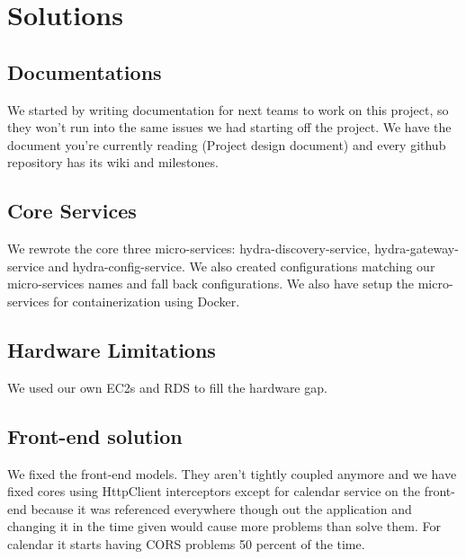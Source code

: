 \chapter{Solutions}
\section{Documentations}
We started by writing documentation for next teams to work on this project, so they won't run into the same issues we had starting off the project. We have the document you're currently reading (Project design document) and every github repository has its wiki and milestones.

\section{Core Services}
We rewrote the core three micro-services: hydra-discovery-service, hydra-gateway-service and hydra-config-service. We also created configurations matching our micro-services names and fall back configurations. We also have setup the micro-services for containerization using Docker.

\section{Hardware Limitations}
We used our own EC2s and RDS to fill the hardware gap.

\section{Front-end solution}
We fixed the front-end models. They aren't tightly coupled anymore and we have fixed cores using HttpClient interceptors except for calendar service on the front-end because it was referenced everywhere though out the application and changing it in the time given would cause more problems than solve them. For calendar it starts having CORS problems 50 percent of the time.